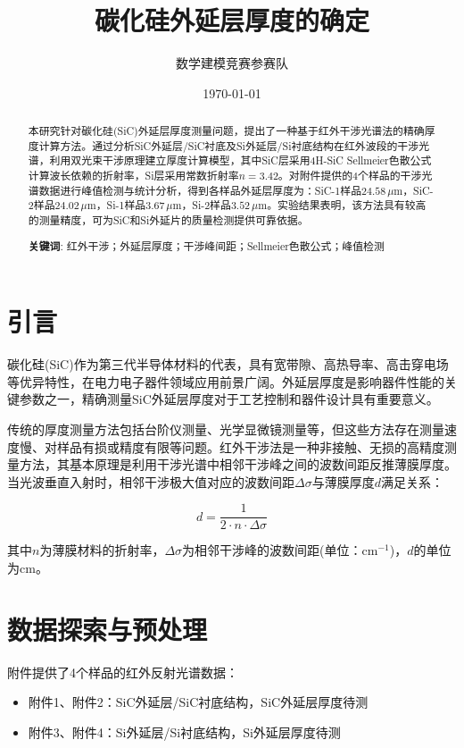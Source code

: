 \documentclass[12pt,a4paper]{article}
\title{\LARGE\bfseries 碳化硅外延层厚度的确定}
\author{数学建模竞赛参赛队}
\date{\today}
\begin{document}
\maketitle

\begin{abstract}
本研究针对碳化硅(SiC)外延层厚度测量问题，提出了一种基于红外干涉光谱法的精确厚度计算方法。通过分析SiC外延层/SiC衬底及Si外延层/Si衬底结构在红外波段的干涉光谱，利用双光束干涉原理建立厚度计算模型，其中SiC层采用4H-SiC Sellmeier色散公式计算波长依赖的折射率，Si层采用常数折射率$n=3.42$。对附件提供的4个样品的干涉光谱数据进行峰值检测与统计分析，得到各样品外延层厚度为：SiC-1样品$24.58\,\mu\text{m}$，SiC-2样品$24.02\,\mu\text{m}$，Si-1样品$3.67\,\mu\text{m}$，Si-2样品$3.52\,\mu\text{m}$。实验结果表明，该方法具有较高的测量精度，可为SiC和Si外延片的质量检测提供可靠依据。

\textbf{关键词}: 红外干涉；外延层厚度；干涉峰间距；Sellmeier色散公式；峰值检测
\end{abstract}

\section{引言}

碳化硅(SiC)作为第三代半导体材料的代表，具有宽带隙、高热导率、高击穿电场等优异特性，在电力电子器件领域应用前景广阔。外延层厚度是影响器件性能的关键参数之一，精确测量SiC外延层厚度对于工艺控制和器件设计具有重要意义。

传统的厚度测量方法包括台阶仪测量、光学显微镜测量等，但这些方法存在测量速度慢、对样品有损或精度有限等问题。红外干涉法是一种非接触、无损的高精度测量方法，其基本原理是利用干涉光谱中相邻干涉峰之间的波数间距反推薄膜厚度。当光波垂直入射时，相邻干涉极大值对应的波数间距$\Delta\sigma$与薄膜厚度$d$满足关系：

\begin{equation}
d = \frac{1}{2 \cdot n \cdot \Delta\sigma}
\end{equation}

其中$n$为薄膜材料的折射率，$\Delta\sigma$为相邻干涉峰的波数间距(单位：cm$^{-1}$)，$d$的单位为cm。

\section{数据探索与预处理}

附件提供了4个样品的红外反射光谱数据：
\begin{itemize}
\item 附件1、附件2：SiC外延层/SiC衬底结构，SiC外延层厚度待测
\item 附件3、附件4：Si外延层/Si衬底结构，Si外延层厚度待测
\end{itemize}
\end{document}
